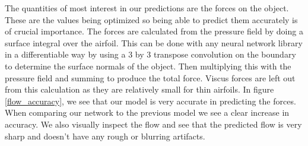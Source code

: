 \documentclass{article} %
\begin{document}
The quantities of most interest in our predictions are the forces on the object. These are the values being optimized so being able to predict them accurately is of crucial importance. The forces are calculated from the pressure field by doing a surface integral over the airfoil. This can be done with any neural network library in a differentiable way by using a 3 by 3 transpose convolution on the boundary to determine the surface normals of the object. Then multiplying this with the pressure field and summing to produce the total force. Viscus forces are left out from this calculation as they are relatively small for thin airfoils. In figure \ref{flow_accuracy}, we see that our model is very accurate in predicting the forces. When comparing our network to the previous model we see a clear increase in accuracy. We also visually inspect the flow and see that the predicted flow is very sharp and doesn't have any rough or blurring artifacts.
\end{document}
